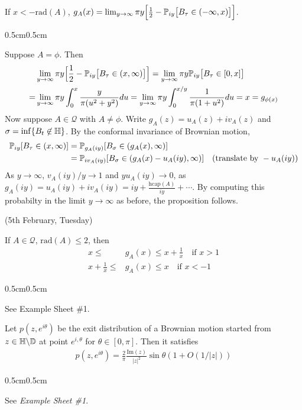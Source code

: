 \documentclass[12pt,a4paper]{article}
\newenvironment{proof}
{\begin{changemargin}{0.5cm}{0.5cm} 
	}%
	{\end{changemargin}
}
\newenvironment{p}
{\begin{proof} 
	}%
	{\end{proof}
}
\begin{document}
\quad If $x< -\text{rad}(A)$, $g_A(x) = \lim_{y\rightarrow \infty} \pi y \Big[ \frac{1}{2} - \mathbb{P}_{iy} \big[ B_{\tau} \in (-\infty, x) \big] \Big]$.
\begin{p}


\pf Suppose $A= \phi$. Then
\begin{align*}
& \lim_{y\rightarrow \infty} \pi y \Big[ \frac{1}{2} - \mathbb{P}_{iy} \big[ B_{\tau} \in (x, \infty) \big] \Big] = \lim_{y\rightarrow \infty} \pi y \mathbb{P}_{iy} \big[ B_{\tau} \in [0,x] \big] \\
=& \lim_{y\rightarrow \infty} \pi y \int_0^x \frac{y}{\pi (u^2 + y^2)} du = \lim_{y\rightarrow \infty} \pi y \int_0^{x/y} \frac{1}{\pi(1+ u^2)} du =x = g_{\phi(x)}
\end{align*}
Now suppose $A\in \mathscr{Q}$ with $A \neq\phi$. Write $g_A(z) = u_A(z) + iv_A(z)$ and $\sigma  = \inf \{B_t \not\in \mathbb{H} \}$. By the conformal invariance of Brownian motion, 
\begin{align*}
\mathbb{P}_{iy} [B_{\tau} \in (x,\infty)] &= \mathbb{P}_{g_A(iy)} [B_{\sigma} \in (g_A(x) , \infty)] \\
&= \mathbb{P}_{iv_A(iy)} [B_{\sigma} \in (g_A(x) - u_A(iy), \infty)] \quad (\text{translate by }-u_A(iy))
\end{align*}
As $y\rightarrow \infty$, $v_A(iy) / y \rightarrow 1$ and $yu_A(iy) \rightarrow 0$, as $g_A(iy) = u_A(iy) + i v_A(iy) = iy + \frac{\text{hcap}(A)}{iy} + \cdots$. By computing this probabilty in the limit $y\rightarrow \infty$ as before, the proposition follows.

\eop
\end{p}
\s

\newday

(5th February, Tuesday)
\s

\corr If $A\in \mathscr{Q}$, $\text{rad}(A)\leq 2$, then 
\begin{align*}
x\leq & g_A(x) \leq x + \frac{1}{x} \quad \text{if } x>1 \\
x+ \frac{1}{x} \leq & g_A(x) \leq x \quad \text{if } x<-1
\end{align*}
\begin{p}
\pf See Example Sheet \#1.
\end{p}
\s

\lem Let $p(z,e^{i\theta})$ be the exit distribution of a Brownian motion started from $z \in \mathbb{H} \backslash \mathbb{D}$ at point $e^{i, \theta}$ for $\theta \in [0, \pi ]$. Then it satisfies
\begin{align*}
p(z, e^{i\theta}) = \frac{2}{\pi} \frac{\text{Im}(z)}{|z|^2} \sin \theta (1+ O(1/|z|))
\end{align*}
\begin{p}
\pf See \emph{Example Sheet \#1}.
\end{p}
\end{document}
